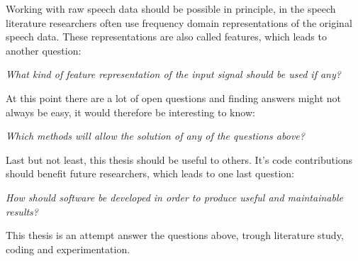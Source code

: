 \newpage

Working with raw speech data should be possible in principle, in the speech literature researchers often use frequency domain representations of the original speech data. These representations are also called features, which leads to another question:

\noindent \textit{What kind of feature representation of the input signal should be used if any?}

At this point there are a lot of open questions and finding answers might not always be easy, it would therefore be interesting to know: 

\noindent \textit{Which methods will allow the solution of any of the questions above?}

Last but not least, this thesis should be useful to others. It's code contributions should benefit future researchers, which leads to one last question:

\noindent \textit{How should software be developed in order to produce useful and maintainable results?}

This thesis is an attempt answer the questions above, trough literature study, coding and experimentation.



